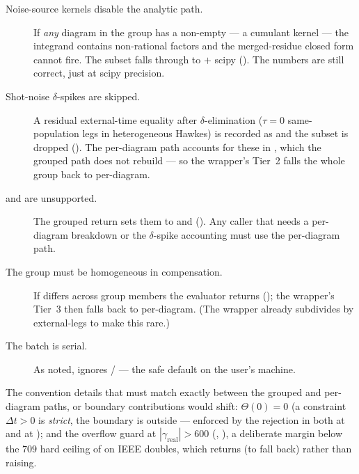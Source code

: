 \begin{description}
  \item[Noise-source kernels disable the analytic path.] If \emph{any} diagram in
        the group has a non-empty  --- a
         cumulant kernel --- the integrand contains
        non-rational factors and the merged-residue closed form cannot fire. The
        subset falls through to  $+$ scipy
        (). The numbers are still correct,
        just at scipy precision.
  \item[Shot-noise $\delta$-spikes are skipped.] A residual external-time equality
        after $\delta$-elimination ($\tau=0$ same-population legs in heterogeneous
        Hawkes) is recorded as  and the
        subset is dropped (). The per-diagram
        path accounts for these in , which the grouped
        path does not rebuild --- so the wrapper's Tier~2 falls the whole group back
        to per-diagram.
  \item[ and  are
        unsupported.] The grouped return sets them to \code{[]} and 
        (). Any caller that needs a
        per-diagram breakdown or the $\delta$-spike accounting must use the
        per-diagram path.
  \item[The group must be homogeneous in compensation.] If
         differs across group members the
        evaluator returns 
        (); the wrapper's Tier~3 then falls
        back to per-diagram. (The wrapper already subdivides by external-legs to
        make this rare.)
  \item[The batch is serial.] As noted,  ignores
        / --- the safe default on the user's
        machine.
\end{description}

\begin{note}
The convention details that must match exactly between the grouped and
per-diagram paths, or boundary contributions would shift: $\Theta(0) = 0$ (a
constraint $\Delta t > 0$ is \emph{strict}, the boundary is outside --- enforced by
the  rejection in both
 at  and
 at ); and
the overflow guard at $|\gamma_{\text{real}}| > 600$
(, ), a deliberate
margin below the $709$ hard ceiling of  on IEEE doubles, which
returns  (to fall back) rather than raising.
\end{note}

